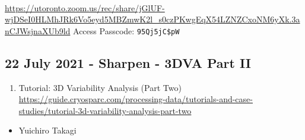 \documentclass[11pt, oneside]{article}   	%
\begin{document}
 \\
{\tiny \url{https://utoronto.zoom.us/rec/share/jGlUF-wjDSeI0HLMhJRk6Vo5eyd5MBZmwK2l_s0czPKwgEqX54LZNZCxoNM6yXk.3anCJWsjnaXUb9ld}}
Access Passcode: \texttt{95Qj5jC\$pW}

\subsection{22 July 2021 - Sharpen - 3DVA Part II}
\begin{enumerate}
	\item Tutorial: 3D Variability Analysis (Part Two) \url{https://guide.cryosparc.com/processing-data/tutorials-and-case-studies/tutorial-3d-variability-analysis-part-two}
\end{enumerate}
\begin{itemize}
	\item Yuichiro Takagi
\end{itemize}
\end{document}
